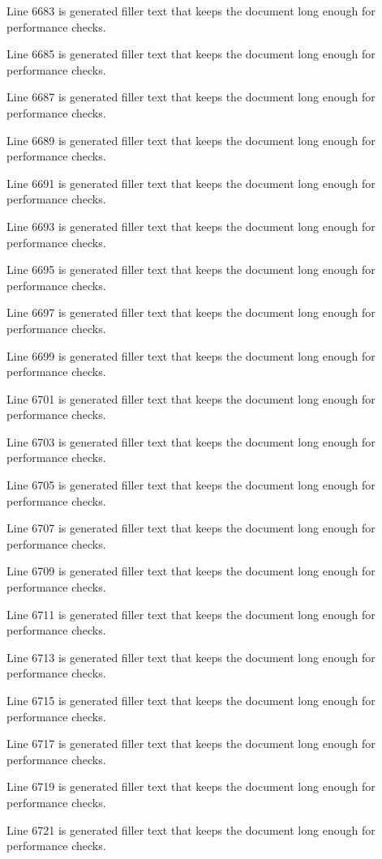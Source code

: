 Line 6683 is generated filler text that keeps the document long enough for performance checks.

Line 6685 is generated filler text that keeps the document long enough for performance checks.

Line 6687 is generated filler text that keeps the document long enough for performance checks.

Line 6689 is generated filler text that keeps the document long enough for performance checks.

Line 6691 is generated filler text that keeps the document long enough for performance checks.

Line 6693 is generated filler text that keeps the document long enough for performance checks.

Line 6695 is generated filler text that keeps the document long enough for performance checks.

Line 6697 is generated filler text that keeps the document long enough for performance checks.

Line 6699 is generated filler text that keeps the document long enough for performance checks.

Line 6701 is generated filler text that keeps the document long enough for performance checks.

Line 6703 is generated filler text that keeps the document long enough for performance checks.

Line 6705 is generated filler text that keeps the document long enough for performance checks.

Line 6707 is generated filler text that keeps the document long enough for performance checks.

Line 6709 is generated filler text that keeps the document long enough for performance checks.

Line 6711 is generated filler text that keeps the document long enough for performance checks.

Line 6713 is generated filler text that keeps the document long enough for performance checks.

Line 6715 is generated filler text that keeps the document long enough for performance checks.

Line 6717 is generated filler text that keeps the document long enough for performance checks.

Line 6719 is generated filler text that keeps the document long enough for performance checks.

Line 6721 is generated filler text that keeps the document long enough for performance checks.

